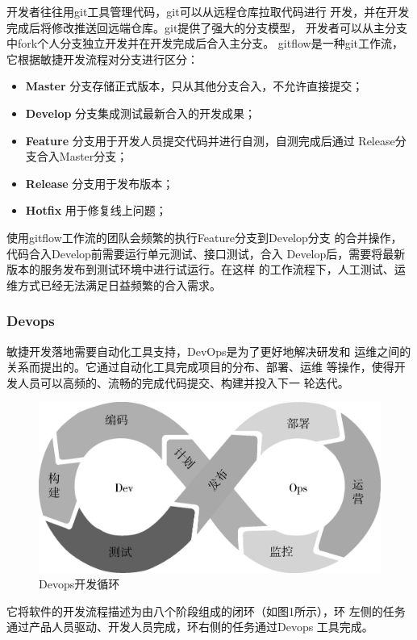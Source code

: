 \documentclass{article}
\begin{document}
  开发者往往用git\cite{git}工具管理代码，git可以从远程仓库拉取代码进行
开发，并在开发完成后将修改推送回远端仓库。git提供了强大的分支模型，
开发者可以从主分支中fork个人分支独立开发并在开发完成后合入主分支。
gitflow\cite{gitflow}是一种git工作流，它根据敏捷开发流程对分支进行区分：
\begin{itemize}
  \item \textbf{Master} 分支存储正式版本，只从其他分支合入，不允许直接提交；
  \item \textbf{Develop} 分支集成测试最新合入的开发成果；
  \item \textbf{Feature} 分支用于开发人员提交代码并进行自测，自测完成后通过
    Release分支合入Master分支；
  \item \textbf{Release} 分支用于发布版本；
  \item \textbf{Hotfix} 用于修复线上问题；
\end{itemize}

  使用gitflow工作流的团队会频繁的执行Feature分支到Develop分支
的合并操作，代码合入Develop前需要运行单元测试、接口测试，合入
Develop后，需要将最新版本的服务发布到测试环境中进行试运行。在这样
的工作流程下，人工测试、运维方式已经无法满足日益频繁的合入需求。

\subsubsection{Devops}
  敏捷开发落地需要自动化工具支持，DevOps是为了更好地解决研发和
运维之间的关系而提出的。它通过自动化工具完成项目的分布、部署、运维
等操作，使得开发人员可以高频的、流畅的完成代码提交、构建并投入下一
轮迭代。
\begin{figure}[ht]
  \centering
  \includegraphics{figures/devops_flow.jpg}
  \caption{Devops开发循环\cite{devops}}
  \label{fig:label}
\end{figure}

  它将软件的开发流程描述为由八个阶段组成的闭环（如图1所示），环
左侧的任务通过产品人员驱动、开发人员完成，环右侧的任务通过Devops
工具完成。
\end{document}
